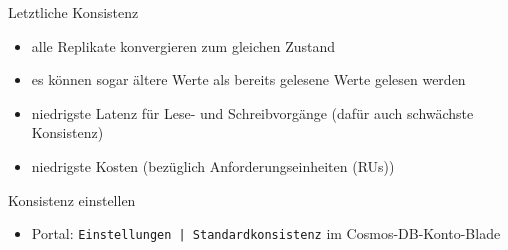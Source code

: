 \begin{flashcard}[Definition]{Letztliche Konsistenz}
    \begin{itemize}
        \item alle Replikate konvergieren zum gleichen Zustand
        \item es können sogar ältere Werte als bereits gelesene Werte gelesen werden
        \item niedrigste Latenz für Lese- und Schreibvorgänge (dafür auch schwächste Konsistenz)
        \item niedrigste Kosten (bezüglich Anforderungseinheiten (RUs))
    \end{itemize}
\end{flashcard}

\begin{flashcard}[Definition]{Konsistenz einstellen}
    \begin{itemize}
        \item Portal: \texttt{Einstellungen | Standardkonsistenz} im Cosmos-DB-Konto-Blade
    \end{itemize}
\end{flashcard}
